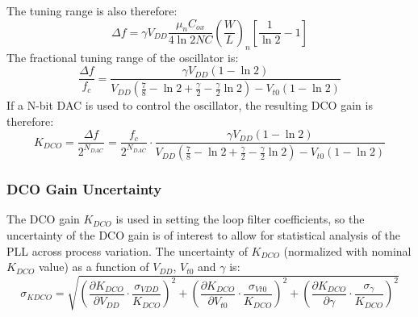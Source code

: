 		The tuning range is also therefore:
		\begin{equation}
			\Delta f = \gamma V_{DD}\frac{\mu_nC_{ox}}{4\ln2NC}\left(\frac{W}{L}\right)_n\left[\frac{1}{\ln2}-1\right]
		\end{equation}
		The fractional tuning range of the oscillator is:
		\begin{equation}
			\frac{\Delta f}{f_c} = \frac{\gamma V_{DD}\left( 1-\ln2 \right)}{V_{DD}\left(\frac{7}{8}-\ln2+\frac{\gamma}{2}-\frac{\gamma}{2}\ln2\right)-V_{t0}\left(1-\ln2\right)}
		\end{equation}	
		If a N-bit DAC is used to control the oscillator, the resulting DCO gain is therefore:
		\begin{equation}
			K_{DCO} = \frac{\Delta f}{2^{N_{DAC}}} = \frac{f_c}{2^{N_{DAC}}}\cdot\frac{\gamma V_{DD}\left( 1-\ln2 \right)}{V_{DD}\left(\frac{7}{8}-\ln2+\frac{\gamma}{2}-\frac{\gamma}{2}\ln2\right)-V_{t0}\left(1-\ln2\right)}
		\end{equation}	
	\subsubsection{DCO Gain Uncertainty}
		The DCO gain $K_{DCO}$ is used in setting the loop filter coefficients, so the uncertainty of the DCO gain is of interest to allow for statistical analysis of the PLL across process variation. The uncertainty of $K_{DCO}$ (normalized with nominal $K_{DCO}$ value) as a function of $V_{DD}$, $V_{t0}$ and $\gamma$ is:
		\begin{equation}
			\sigma_{KDCO} = \sqrt{\left(\frac{\partial K_{DCO}}{\partial V_{DD}}\cdot\frac{\sigma_{VDD}}{K_{DCO}} \right)^2 + \left(\frac{\partial K_{DCO}}{\partial V_{t0}}\cdot\frac{\sigma_{Vt0}}{K_{DCO}} \right)^2 + \left(\frac{\partial K_{DCO}}{\partial \gamma}\cdot\frac{\sigma_\gamma}{K_{DCO}} \right)^2}
		\end{equation}

